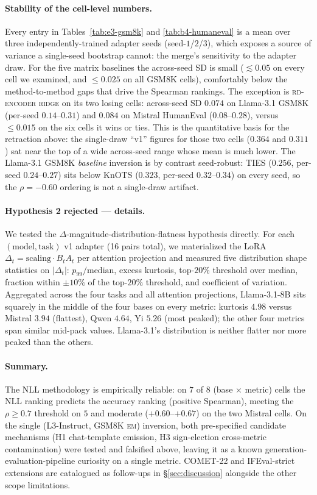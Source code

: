 \paragraph{Stability of the cell-level numbers.}
Every entry in Tables~\ref{tab:e3-gsm8k} and \ref{tab:b4-humaneval} is
a mean over three independently-trained adapter seeds
(seed-$1$/$2$/$3$), which exposes a source of variance a single-seed
bootstrap cannot: the merge's sensitivity to the adapter draw. For the
five matrix baselines the across-seed SD is small ($\lesssim 0.05$ on
every cell we examined, and $\leq 0.025$ on all GSM8K cells),
comfortably below the method-to-method gaps that drive the Spearman
rankings. The exception is \textsc{rd-encoder ridge} on its two losing
cells: across-seed SD $0.074$ on Llama-3.1 GSM8K (per-seed
$0.14$--$0.31$) and $0.084$ on Mistral HumanEval ($0.08$--$0.28$),
versus $\leq 0.015$ on the six cells it wins or ties. This is the
quantitative basis for the retraction above: the single-draw ``v1''
figures for those two cells ($0.364$ and $0.311$) sat near the top of a
wide across-seed range whose mean is much lower. The Llama-3.1 GSM8K
\emph{baseline} inversion is by contrast seed-robust: TIES ($0.256$,
per-seed $0.24$--$0.27$) sits below KnOTS ($0.323$, per-seed
$0.32$--$0.34$) on every seed, so the $\rho = -0.60$ ordering is not a
single-draw artifact.

\paragraph{Hypothesis 2 rejected --- details.}
We tested the $\Delta$-magnitude-distribution-flatness
hypothesis directly. For each $(\text{model}, \text{task})$ v1
adapter (16 pairs total), we materialized the LoRA $\Delta_t =
\mathrm{scaling} \cdot B_t A_t$ per attention projection and
measured five distribution shape statistics on $|\Delta_t|$:
$p_{99} / \mathrm{median}$, excess kurtosis, top-$20\%$
threshold over median, fraction within $\pm 10\%$ of the
top-$20\%$ threshold, and coefficient of variation. Aggregated
across the four tasks and all attention projections,
Llama-3.1-8B sits squarely in the middle of the four bases on
every metric: kurtosis $4.98$ versus Mistral $3.94$ (flattest),
Qwen $4.64$, Yi $5.26$ (most peaked); the other four metrics
span similar mid-pack values. Llama-3.1's distribution is
neither flatter nor more peaked than the others.

\paragraph{Summary.}
The NLL methodology is empirically reliable: on $7$ of $8$
(base $\times$ metric) cells the NLL ranking predicts the accuracy
ranking (positive Spearman), meeting the $\rho \geq 0.7$ threshold on
$5$ and moderate ($+0.60$--$+0.67$) on the two Mistral cells. On the
single (L3-Instruct, GSM8K \textsc{em}) inversion, both pre-specified
candidate mechanisms (H1 chat-template emission, H3 sign-election
cross-metric contamination) were tested and falsified above, leaving
it as a known generation-evaluation-pipeline curiosity on a single
metric. COMET-22 and IFEval-strict extensions are catalogued as
follow-ups in \S\ref{sec:discussion} alongside the other scope
limitations.

